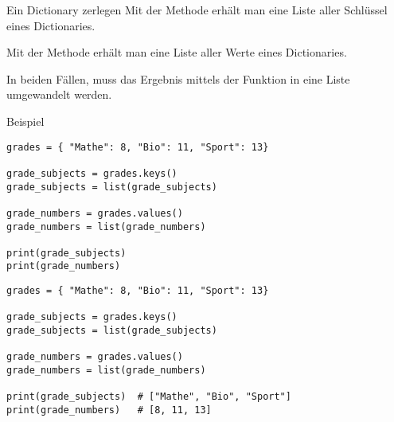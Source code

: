 \begin{fragile}

\begin{block}{Ein Dictionary zerlegen}
\vspace{2pt}
Mit der Methode  erhält man eine Liste aller Schlüssel eines Dictionaries. \pause

Mit der Methode  erhält man eine Liste aller Werte eines Dictionaries. \pause 

In beiden Fällen, muss das Ergebnis mittels der Funktion  in eine Liste umgewandelt werden. 
\end{block}


\vspace{12pt}
\pause 

\begin{exampleblock}{Beispiel}
\vspace{2pt}
\begin{overprint}
\begin{verbatim}
grades = { "Mathe": 8, "Bio": 11, "Sport": 13}

grade_subjects = grades.keys()
grade_subjects = list(grade_subjects)

grade_numbers = grades.values()
grade_numbers = list(grade_numbers)

print(grade_subjects)
print(grade_numbers)
\end{verbatim}
\begin{verbatim}
grades = { "Mathe": 8, "Bio": 11, "Sport": 13}

grade_subjects = grades.keys()
grade_subjects = list(grade_subjects)

grade_numbers = grades.values()
grade_numbers = list(grade_numbers)

print(grade_subjects)  # ["Mathe", "Bio", "Sport"]
print(grade_numbers)   # [8, 11, 13]
\end{verbatim}
\end{overprint}
\end{exampleblock}
\end{fragile}





